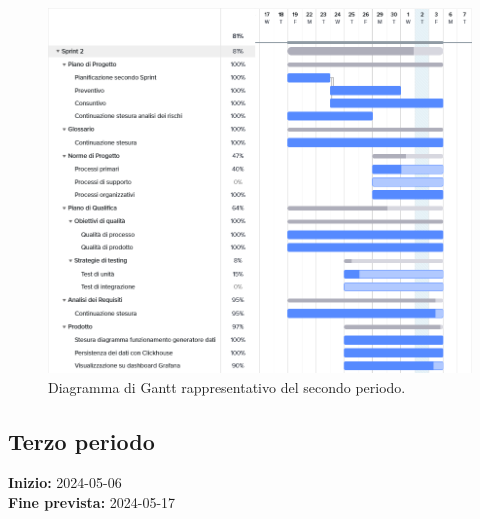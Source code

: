 \documentclass[8pt]{article}
\begin{document}
\begin{figure}[h]
    \centering
    \includegraphics[width=13cm]{./images_pdp/gantt2.png}
    \caption{Diagramma di Gantt rappresentativo del secondo periodo.}
    \label{figure:Diagramma di Gantt rappresentativo del secondo periodo}
\end{figure}
\newpage
\clearpage
\subsection{Terzo periodo} \label{sec:3_rtb}
\textbf{Inizio:} 2024-05-06\\
\textbf{Fine prevista:} 2024-05-17
\end{document}
